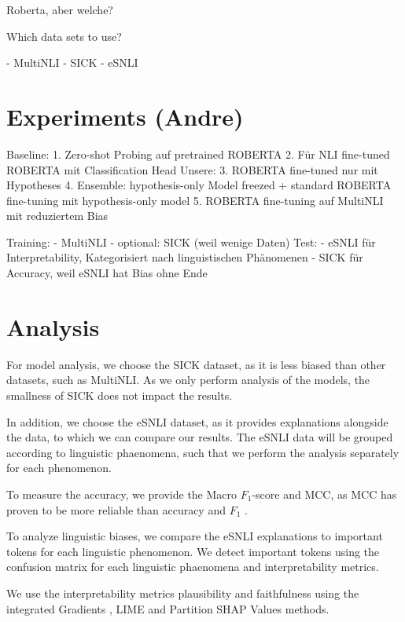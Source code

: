 \documentclass[12pt,a4paper]{article}
\begin{document}
Roberta, aber welche?

Which data sets to use?

- MultiNLI
- SICK
- eSNLI

\section{Experiments (Andre)}
Baseline:
1. Zero-shot Probing auf pretrained ROBERTA
2. Für NLI fine-tuned ROBERTA mit Classification Head
Unsere:
3. ROBERTA fine-tuned nur mit Hypotheses
4. Ensemble: hypothesis-only Model freezed + standard ROBERTA fine-tuning mit hypothesis-only model
5. ROBERTA fine-tuning auf MultiNLI mit reduziertem Bias

Training:
- MultiNLI
- optional: SICK (weil wenige Daten)
Test:
- eSNLI für Interpretability, Kategorisiert nach linguistischen Phänomenen
- SICK für Accuracy, weil eSNLI hat Bias ohne Ende

\section{Analysis}

For model analysis, we choose the SICK dataset, as it is less biased than other datasets, such as MultiNLI. As we only perform analysis of the models, the smallness of SICK does not impact the results.

In addition, we choose the eSNLI dataset, as it provides explanations alongside the data, to which we can compare our results. The eSNLI data will be grouped according to linguistic phaenomena, such that we perform the analysis separately for each phenomenon.

To measure the accuracy, we provide the Macro $F_1$-score \parencite{macrof1} and \ac{MCC}\parencite{mcc}, as \ac{MCC} has proven to be more reliable than accuracy and $F_1$ \parencite{mccGood}.


To analyze linguistic biases, we compare the eSNLI explanations to important tokens for each linguistic phenomenon. We detect important tokens using the confusion matrix for each linguistic phaenomena and interpretability metrics.

We use the interpretability metrics plausibility and faithfulness \parencite{attanasio2022ferret} using the integrated Gradients \parencite{sundararajan2017integratedgradients}, LIME \parencite{ribeiro2016lime} and Partition SHAP Values \parencite{lundberg2017shap} methods.

\printbibliography
\end{document}
